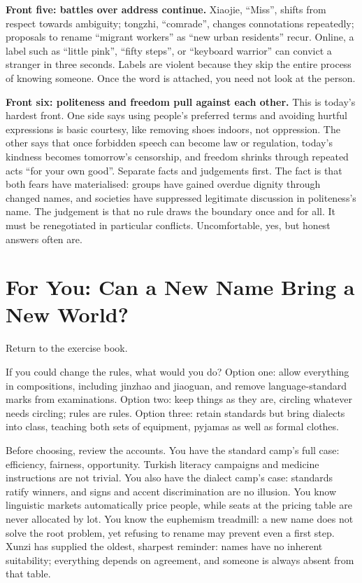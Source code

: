 \textbf{Front five: battles over address continue.} Xiaojie, ``Miss'', shifts from respect towards ambiguity; tongzhi, ``comrade'', changes connotations repeatedly; proposals to rename ``migrant workers'' as ``new urban residents'' recur. Online, a label such as ``little pink'', ``fifty steps'', or ``keyboard warrior'' can convict a stranger in three seconds. Labels are violent because they skip the entire process of knowing someone. Once the word is attached, you need not look at the person.

\textbf{Front six: politeness and freedom pull against each other.} This is today's hardest front. One side says using people's preferred terms and avoiding hurtful expressions is basic courtesy, like removing shoes indoors, not oppression. The other says that once forbidden speech can become law or regulation, today's kindness becomes tomorrow's censorship, and freedom shrinks through repeated acts ``for your own good''. Separate facts and judgements first. The fact is that both fears have materialised: groups have gained overdue dignity through changed names, and societies have suppressed legitimate discussion in politeness's name. The judgement is that no rule draws the boundary once and for all. It must be renegotiated in particular conflicts. Uncomfortable, yes, but honest answers often are.

\section[For You: A New Name, a New World?]{For You: Can a New Name Bring a New World?}
Return to the exercise book.

If you could change the rules, what would you do? Option one: allow everything in compositions, including jinzhao and jiaoguan, and remove language-standard marks from examinations. Option two: keep things as they are, circling whatever needs circling; rules are rules. Option three: retain standards but bring dialects into class, teaching both sets of equipment, pyjamas as well as formal clothes.

Before choosing, review the accounts. You have the standard camp's full case: efficiency, fairness, opportunity. Turkish literacy campaigns and medicine instructions are not trivial. You also have the dialect camp's case: standards ratify winners, and signs and accent discrimination are no illusion. You know linguistic markets automatically price people, while seats at the pricing table are never allocated by lot. You know the euphemism treadmill: a new name does not solve the root problem, yet refusing to rename may prevent even a first step. Xunzi has supplied the oldest, sharpest reminder: names have no inherent suitability; everything depends on agreement, and someone is always absent from that table.

